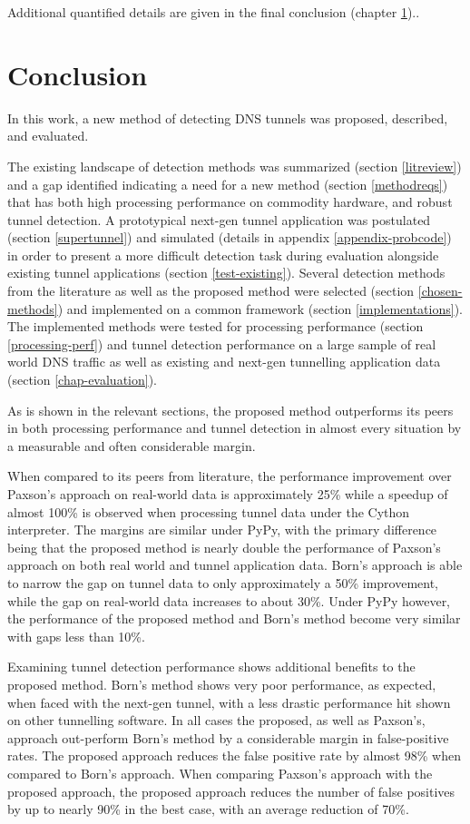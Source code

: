 \documentclass[12pt]{report}
\theoremstyle{remark}
\theoremstyle{definition}
\theoremstyle{definition}
\theoremstyle{definition}
\begin{document}
Additional quantified details are given in the final conclusion (chapter \ref{conclusion})..

\chapter{Conclusion}
\label{conclusion}

In this work, a new method of detecting DNS tunnels was proposed, described, and
evaluated.

The existing landscape of detection methods was summarized (section
\ref{litreview}) and a gap identified indicating a need for a new method
(section \ref{methodreqs}) that has both high processing performance on
commodity hardware, and robust tunnel detection. A prototypical next-gen tunnel
application was postulated (section \ref{supertunnel}) and simulated (details in
appendix \ref{appendix-probcode}) in order to present a more difficult detection
task during evaluation alongside existing tunnel applications (section
\ref{test-existing}). Several detection methods from the literature as well as
the proposed method were selected (section \ref{chosen-methods}) and implemented
on a common framework (section \ref{implementations}). The implemented methods
were tested for processing performance (section \ref{processing-perf}) and
tunnel detection performance on a large sample of real world DNS traffic as well
as existing and next-gen tunnelling application data (section
\ref{chap-evaluation}).

As is shown in the relevant sections, the proposed method outperforms its peers
in both processing performance and tunnel detection in almost every situation by
a measurable and often considerable margin.

When compared to its peers from literature, the performance improvement over
Paxson's approach on real-world data is approximately 25\% while a speedup of
almost 100\% is observed when processing tunnel data under the Cython
interpreter. The margins are similar under PyPy, with the primary difference
being that the proposed method is nearly double the performance of Paxson's
approach on both real world and tunnel application data. Born's approach is able
to narrow the gap on tunnel data to only approximately a 50\% improvement, while
the gap on real-world data increases to about 30\%. Under PyPy however, the
performance of the proposed method and Born's method become very similar with
gaps less than 10\%.

Examining tunnel detection performance shows additional benefits to the proposed
method. Born's method shows very poor performance, as expected, when faced with
the next-gen tunnel, with a less drastic performance hit shown on other
tunnelling software. In all cases the proposed, as well as Paxson's, approach
out-perform Born's method by a considerable margin in false-positive rates. The
proposed approach reduces the false positive rate by almost 98\% when compared
to Born's approach. When comparing Paxson's approach with the proposed
approach, the proposed approach reduces the number of false positives by up to
nearly 90\% in the best case, with an average reduction of 70\%.
\end{document}
